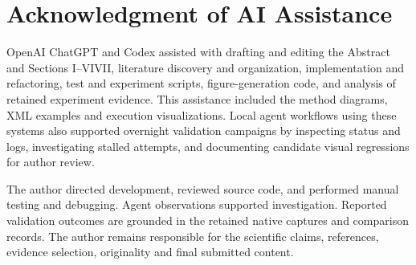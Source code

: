 \section*{Acknowledgment of AI Assistance}
OpenAI ChatGPT and Codex assisted with drafting and editing the Abstract and
Sections I--\ifdefined\withoutreferences VI\else VII\fi, literature discovery and organization, implementation and
refactoring, test and experiment scripts, figure-generation code, and analysis
of retained experiment evidence. This assistance included the method diagrams,
XML examples and execution visualizations. Local agent workflows using these
systems also supported overnight validation campaigns by inspecting status and
logs, investigating stalled attempts, and documenting candidate visual
regressions for author review.

The author directed development, reviewed source code, and performed manual
testing and debugging. Agent observations supported investigation. Reported
validation outcomes are grounded in the retained native captures and comparison
records. The author remains responsible for the scientific claims, references,
evidence selection, originality and final submitted content.

